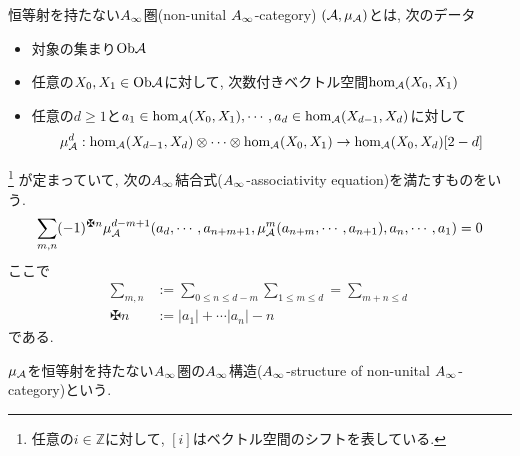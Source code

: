 \documentclass[uplatex, a4paper, 14Q, dvipdfmx]{jsarticle}
\begin{document}
\begin{definition} \label{def_non_unital_Ainf_cat}
  恒等射を持たない$A_{\infty}$圏(non-unital $A_{\infty}$-category) $(\mathcal{A},\mu_{\mathcal{A}})$とは, 次のデータ
  \begin{itemize}
    \item 対象の集まり$\mathrm{Ob}\mathcal{A}$ 
    \item 任意の$X_0, X_1 \in \mathrm{Ob}\mathcal{A}$に対して, 次数付きベクトル空間$\hom_{\mathcal{A}}(X_0,X_1)$
    \item 任意の$d \geq 1$と$a_1 \in \hom_{\mathcal{A}}(X_0,X_1), \cdots, a_d \in \hom_{\mathcal{A}}(X_{d-1},X_d)$に対して
    \begin{align*}
      \mu^d_{\mathcal{A}} : \hom_{\mathcal{A}}(X_{d-1},X_d) \otimes \cdots \otimes \hom_{\mathcal{A}}(X_0,X_1) \to \hom_{\mathcal{A}}(X_0,X_d)[2-d]
    \end{align*}
  \end{itemize}
  \footnote{
    任意の$i \in \mathbb{Z}$に対して, $[i]$はベクトル空間のシフトを表している.
  }
  が定まっていて, 次の$A_{\infty}$結合式($A_{\infty}$-associativity equation)を満たすものをいう. 
  \begin{align*}
    \sum_{m,n} (-1)^{\maltese n} \mu^{d-m+1}_\A(a_d,\cdots,a_{n+m+1}, \mu^m_\A(a_{n+m},\cdots,a_{n+1}), a_n,\cdots,a_1)
    = 0
  \end{align*}
  ここで
  \begin{align*}
    \sum_{m,n} &:= \sum_{0 \leq n \leq d-m} \sum_{1 \leq m \leq d} = \sum_{m+n \leq d} \\
    \maltese n &:= |a_1| + \cdots |a_n| - n
  \end{align*}
  である. 

  $\mu_{\mathcal{A}}$を恒等射を持たない$A_{\infty}$圏の$A_{\infty}$構造($A_{\infty}$-structure of non-unital $A_{\infty}$-category)という. 
\end{definition}
\end{document}
